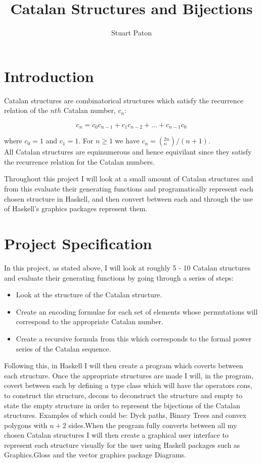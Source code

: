\documentclass[10pt]{article}
\begin{document}
\title{Catalan Structures and Bijections}
\author{Stuart Paton}

\maketitle
\thispagestyle{empty}


\section{Introduction}
Catalan structures are combinatorical structures which satisfy the recurrence relation of the $nth$ Catalan number, $c_{n}$:

\begin{equation}
c_{n} = c_{0}c_{n-1} + c_{1}c_{n-2} + ... + c_{n-1}c_{0}
\end{equation} 

where $c_{0} = 1$ and $c_{1} = 1$. For $n \ge 1$ we have $c_{n} = (^{2n}_{n})/(n+1)$. \cite{McShine_onThe} 
\\All Catalan structures are equinumerous and hence equivilant since they satisfy the recurrence relation for the Catalan numbers.

Throughout this project I will look at a small amount of Catalan structures and from this evaluate their generating functions and programatically represent each chosen structure in Haskell, and then convert between each and through the use of Haskell's graphics packages represent them.

\section{Project Specification}
In this project, as stated above, I will look at roughly 5 - 10 Catalan structures and evaluate their generating functions by going through a series of steps:
\begin{itemize}
\renewcommand{\labelitemi}{$\bullet$}
\item Look at the structure of the Catalan structure.
\item Create an encoding formulae for each set of elements whose permutations will correspond to the appropriate Catalan number.
\item Create a recursive formula from this which corresponds to the formal power series of the Catalan sequence.
\end{itemize}

Following this, in Haskell I will then create a program which coverts between each structure. Once the appropriate structures are made I will, in the program, covert between each by defining a type class which will have the operators cons, to construct the structure, decons to deconstruct the structure and empty to state the empty structure in order to represent the bijections of the Catalan structures. Examples of which could be: Dyck paths, Binary Trees and convex polygons with $n+2$ sides.When the program fully converts between all my chosen Catalan structures I will then create a graphical user interface to represent each structure visually for the user using Haskell packages such as Graphics.Gloss and the vector graphics package Diagrams.
\end{document}
